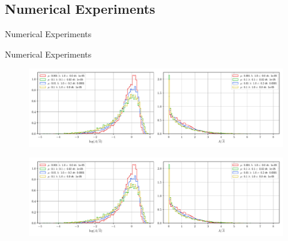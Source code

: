 \documentclass[usenames,dvipsnames]{beamer}
\begin{document}
        
        


\subsection{Numerical Experiments}

\begin{frame}{Numerical Experiments}
    \begin{minipage}{0.5\textwidth}
    
    \end{minipage}
\end{frame}


\begin{frame}{Numerical Experiments}
\begin{figure}
    \includegraphics[trim={0 0 44em 0},clip=true,scale=0.4]{figures/coupled_model/new_data/areas.pdf}
\end{figure}
\vspace{-1.5em}
\begin{figure}
    \includegraphics[trim={43em 0 0 0},clip=true,scale=0.4]{figures/coupled_model/new_data/areas.pdf}
\end{figure}
\end{frame}
\end{document}
